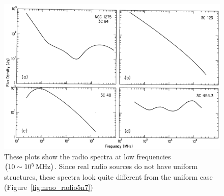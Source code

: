 \begin{figure}[htbp]
	\centering
	\includegraphics[width=.9\linewidth]{Chapter_2/Figures/NRAO_radio5n8.png}
    \caption[The spectrum of synchrotron radiation from real sources]{\label{fig:nrao_radio5n8}
        These plots show the radio spectra at low frequencies $\left(10 \sim 10^5\,\mathrm{MHz}\right)$.
        Since real radio sources do not have uniform structures, these spectra look quite different from the uniform case (Figure~\ref{fig:nrao_radio5n7})
    }
\end{figure}
